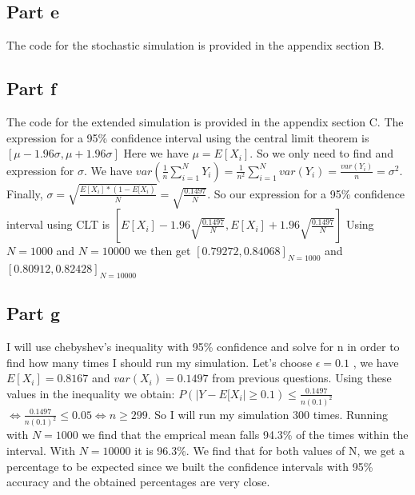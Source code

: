 \documentclass[10pt]{article}
\begin{document}
\subsection*{Part e}
The code for the stochastic simulation is provided in the appendix section B. 

\subsection*{Part f}
The code for the extended simulation is provided in the appendix section C.
The expression for a 95\% confidence interval using the central limit theorem is $[\mu − 1.96\sigma, \mu + 1.96\sigma]$
Here we have $ \mu = E[X_{i}] $. So we only need to find and expression for $ \sigma $.
We have $ var(\frac{1}{n} \sum_{i=1}^N Y_{i}) = \frac{1}{n^2} \sum_{i=1}^N var(Y_{i}) = \frac{var(Y_{i})}{n} = \sigma^2$.
Finally, $ \sigma = \sqrt{\frac{E[X_{i}] * (1 - E[X_{i})}{N}} = \sqrt{\frac{0.1497}{N}} $. So our expression for
a 95\% confidence interval using CLT is $[E[X_{i}] − 1.96\sqrt{\frac{0.1497}{N}}, E[X_{i}] + 1.96\sqrt{\frac{0.1497}{N}}]$
Using $ N = 1000 $ and $ N = 10000 $ we then get $ [0.79272, 0.84068]_{N=1000} $ and $ [0.80912, 0.82428]_{N=10000} $ 
\subsection*{Part g}
I will use chebyshev's inequality with 95\% confidence and solve for n in order to find how many times I should run
my simulation. Let's choose $\epsilon = 0.1 $ , we have $ E[X_{i}] = 0.8167 $ and $ var(X_{i}) = 0.1497$
from previous questions. Using these values in the inequality we obtain: $ P(|Y - E[X_{i}| \geq 0.1) \leq \frac{0.1497}{n(0.1)^2} $
$\Leftrightarrow \frac{0.1497}{n(0.1)^2} \leq 0.05 \Leftrightarrow n \geq 299$. So I will run my simulation 300 times.
Running with $ N = 1000 $ we find that the emprical mean falls 94.3\% of the times within the interval. With 
$ N = 10000 $ it is 96.3\%. We find that for both values of N, we get a percentage to be expected since
we built the confidence intervals with 95\% accuracy and the obtained percentages are very close.
\end{document}
